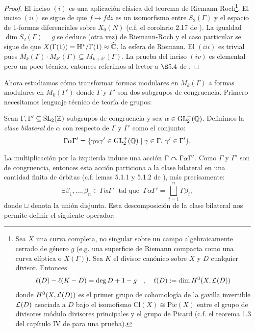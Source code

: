 \begin{proof}
  El inciso $(i)$ es una aplicaci\'on cl\'asica del teorema de Riemann-Roch\footnote{Sea $X$ una
    curva completa, no singular sobre un campo algebraicamente cerrado de g\'enero $g$ (e.g. una
    superficie de Riemann compacta como una curva el\'iptica o $X(\Gamma)$). Sea $K$ el divisor
    can\'onico sobre $X$ y $D$ cualquier divisor. Entonces
    \[
      \ell(D)-\ell(K-D)=\deg D+1-g\quad,\quad\ell(D):=\dim H^0(X,\mathcal{L}(D))
    \]
    donde $H^0(X,\mathcal{L}(D))$ es el primer grupo de cohomolog\'ia de la gavilla invertible $\mathcal{L}(D)$
    asociada a $D$ bajo el isomofismo $\mathrm{Cl}(X)\cong\mathrm{Pic}(X)$ entre el grupo de
    divisores m\'odulo divisores principales y el grupo de Picard (c.f. el teorema 1.3 del
    cap\'itulo IV de \cite{HartshorneAG} para una prueba).}. El inciso $(ii)$ se sigue de que
  $f\mapsto fdz$ es un isomorfismo entre $S_2(\Gamma)$ y el espacio de 1-formas diferenciales
  sobre $X_0(N)$ (c.f. el corolario 2.17 de \cite{ShimuraITTATOAF}). La igualdad $\dim S_2(\Gamma)=g$
  se deduce (otra vez) de Riemann-Roch y el caso particular se sigue de que
  $X(\Gamma(1))=\HH^*/\Gamma(1)\approx\what{\CC}$, la esfera de Riemann. El
  $(iii)$ es trivial pues $M_k(\Gamma)\cdot M_{k'}(\Gamma)\subseteq M_{k+k'}(\Gamma)$. La prueba
  del inciso $(iv)$ es elemental pero un poco t\'ecnica, entonces referimos al lector a $\S 5.4$
  de \cite{DiamondShurmanAFCIMF}.
\end{proof}

Ahora estudiamos c\'omo transformar formas modulares en $M_k(\Gamma)$ a formas modulares en
$M_k(\Gamma')$ donde $\Gamma$ y $\Gamma'$ son dos subgrupos de congruencia. Primero necesitamos
lenguaje t\'ecnico de teor\'ia de grupos:

\begin{defin}
  Sean $\Gamma,\Gamma'\subseteq\mathrm{SL}_2(\mathbb{Z})$ subgrupos de congruencia y sea $\alpha\in\mathrm{GL}_2^+(\mathbb{Q})$.
  Definimos la \emph{clase bilateral} de $\alpha$ con respecto de $\Gamma$ y $\Gamma'$ como el
  conjunto:
  \[
    \Gamma\alpha\Gamma'=\{\gamma\alpha\gamma'\in\mathrm{GL}_2^+(\mathbb{Q})\mid \gamma\in\Gamma,\,\gamma'\in\Gamma'\}.
  \]
\end{defin}

La multiplicaci\'on por la izquierda induce una acci\'on $\Gamma\curvearrowright\Gamma\alpha\Gamma'$. Como
$\Gamma$ y $\Gamma'$ son de congruencia, entonces esta acci\'on particiona a la clase bilateral
en una cantidad finita de \'orbitas (c.f. lemas 5.1.1 y 5.1.2 de \cite{DiamondShurmanAFCIMF}),
m\'as precisamente:
\begin{equation}
  \label{eq:clasebilateralpart}
  \exists\beta_1,\ldots,\beta_n\in\Gamma\alpha\Gamma'\;\;\text{tal que}\;\;
  \Gamma\alpha\Gamma'=\bigsqcup_{i=1}^n\Gamma\beta_i,
\end{equation}
donde $\sqcup$ denota la uni\'on disjunta. Esta descomposici\'on de la clase bilateral nos permite
definir el siguiente operador:

